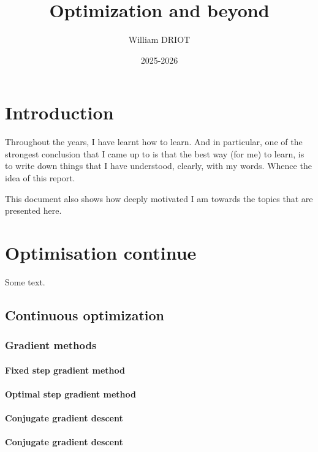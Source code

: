 \documentclass[12pt]{book}
\title{\textbf{Optimization and beyond}}
\author{William DRIOT}
\date{2025-2026}
\begin{document}
\maketitle

\tableofcontents
\chapter{Introduction}

Throughout the years, I have learnt how to learn. And in particular, one of the strongest conclusion that I came up to is that the best way (for me) to learn, is to write down things that I have understood, clearly, with my words. Whence the idea of this report. 

This document also shows how deeply motivated I am towards the topics that are presented here.


\pagestyle{fancy}
\fancyhead[LE,RO]{\nouppercase{\rightmark}}
\fancyhead[LO,RE]{\nouppercase{\leftmark}}
\renewcommand{\chaptermark}[1]{%
\markboth{\chaptername\ \thechapter.\ #1}{}}
\renewcommand{\sectionmark}[1]{\markright{\thesection.\ #1}}


\chapter{Optimisation continue}
Some text.


\section{Continuous optimization}
\subsection{Gradient methods}
\subsubsection{Fixed step gradient method}
\subsubsection{Optimal step gradient method}
\subsubsection{Conjugate gradient descent}
\subsubsection{Conjugate gradient descent}
\end{document}
